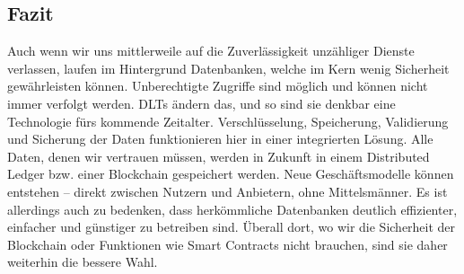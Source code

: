 \subsection{Fazit}
Auch wenn wir uns mittlerweile auf die Zuverlässigkeit unzähliger Dienste verlassen, laufen im Hintergrund Datenbanken, welche im Kern wenig Sicherheit gewährleisten können. 
Unberechtigte Zugriffe sind möglich und können nicht immer verfolgt werden. DLTs ändern das, und so sind sie denkbar eine Technologie fürs kommende Zeitalter. 
Verschlüsselung, Speicherung, Validierung und Sicherung der Daten funktionieren hier in einer integrierten Lösung. 
Alle Daten, denen wir vertrauen müssen, werden in Zukunft in einem Distributed Ledger bzw. einer Blockchain gespeichert werden. Neue Geschäftsmodelle können entstehen – direkt zwischen Nutzern und Anbietern, ohne Mittelsmänner. 
Es ist allerdings auch zu bedenken, dass herkömmliche Datenbanken deutlich effizienter, einfacher und günstiger zu betreiben sind.
Überall dort, wo wir die Sicherheit der Blockchain oder Funktionen wie Smart Contracts nicht brauchen, sind sie daher weiterhin die bessere Wahl.